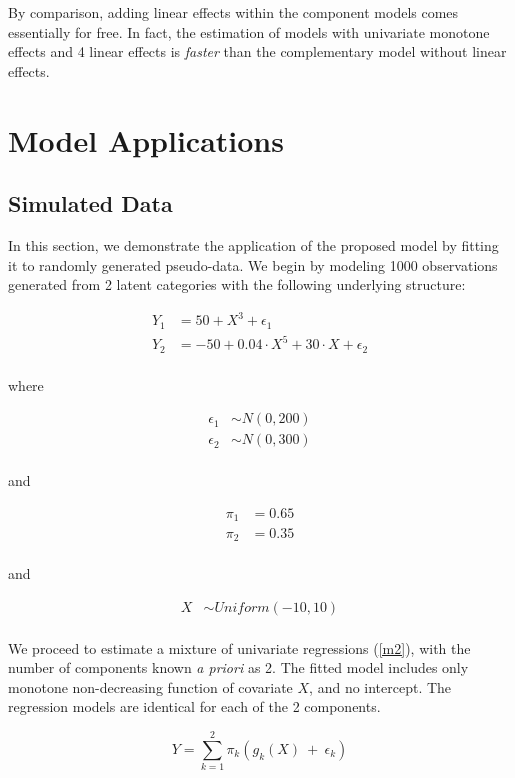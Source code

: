 \documentclass[10pt]{olplainarticle}\usepackage[]{graphicx}\usepackage[]{color}
\begin{document}
By comparison, adding linear effects within the component models comes essentially for free. In fact, the estimation of models with univariate monotone effects and 4 linear effects is \emph{faster} than the complementary model without linear effects. 

\section{Model Applications}
\subsection{Simulated Data}

In this section, we demonstrate the application of the proposed model by fitting it to randomly generated pseudo-data. We begin by modeling 1000 observations generated from 2 latent categories with the following underlying structure:

\begin{align*}
  Y_{1} &= 50 + X^3 + \epsilon_1 \\
  Y_{2} &= -50 + 0.04 \cdot X^5 + 30 \cdot X + \epsilon_2 \\
\end{align*}

where 

\begin{align*}
  \epsilon_1 &\sim N(0,200) \\
  \epsilon_2 &\sim N(0,300) \\
\end{align*}

and

\begin{align*}
  \pi_1 &= 0.65 \\
  \pi_2 &= 0.35 \\
\end{align*}

and

\begin{align*}
  X &\sim Uniform(-10,10) \\
\end{align*}


We proceed to estimate a mixture of univariate regressions (\ref{m2}), with the number of components known \emph{a priori} as 2. The fitted model includes only monotone non-decreasing function of covariate $X$, and no intercept. The regression models are identical for each of the 2 components.

\begin{equation} \label{m2}
  Y = \sum_{k=1}^{2}\pi_k (g_{k} (X) \ +\  \epsilon_k)
\end{equation}
\end{document}
